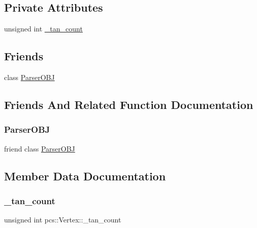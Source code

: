 \subsection*{Private Attributes}
\begin{DoxyCompactItemize}
\item 
unsigned int \hyperlink{structpcs_1_1Vertex_ab1f7321f7bef7ab3f5109fd8164fbbfa}{\+\_\+tan\+\_\+count}
\end{DoxyCompactItemize}
\subsection*{Friends}
\begin{DoxyCompactItemize}
\item 
class \hyperlink{structpcs_1_1Vertex_a6af4ec71dcf05fde5ec2b2fab661e07a}{Parser\+O\+BJ}
\end{DoxyCompactItemize}


\subsection{Friends And Related Function Documentation}
\mbox{\label{structpcs_1_1Vertex_a6af4ec71dcf05fde5ec2b2fab661e07a}} 
\subsubsection{\texorpdfstring{Parser\+O\+BJ}{ParserOBJ}}
{\footnotesize\ttfamily friend class \hyperlink{classpcs_1_1ParserOBJ}{Parser\+O\+BJ}\hspace{0.3cm}{\ttfamily [friend]}}



\subsection{Member Data Documentation}
\mbox{\label{structpcs_1_1Vertex_ab1f7321f7bef7ab3f5109fd8164fbbfa}} 
\subsubsection{\texorpdfstring{\+\_\+tan\+\_\+count}{\_tan\_count}}
{\footnotesize\ttfamily unsigned int pcs\+::\+Vertex\+::\+\_\+tan\+\_\+count\hspace{0.3cm}{\ttfamily [private]}}

